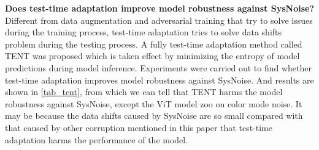 \textbf{Does test-time adaptation improve model robustness against SysNoise?}
Different from data augmentation and adversarial training that try to solve issues during the training process, test-time adaptation tries to solve data shifts problem during the testing process. A fully test-time adaptation method called TENT \cite{tent} was proposed which is taken effect by minimizing the entropy of model predictions during model inference. Experiments were carried out to find whether test-time adaptation improves model robustness against SysNoise. And results are shown in \autoref{tab_tent}, from which we can tell that TENT harms the model robustness against SysNoise, except the ViT model zoo on color mode noise. It may be because the data shifts caused by SysNoise are so small compared with that caused by other corruption mentioned in this paper that test-time adaptation harms the performance of the model.


